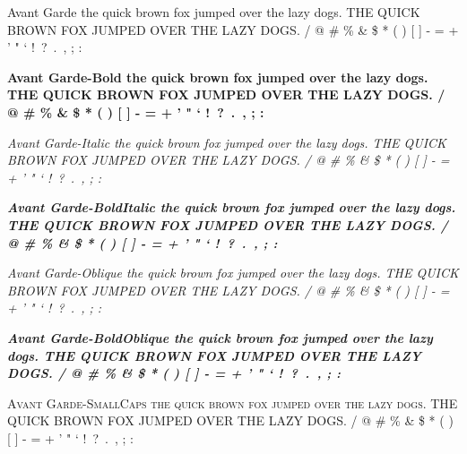 \documentclass{article}
\begin{document}
\newpage
{\selectfont
Avant Garde \newline
the quick brown fox jumped over the lazy dogs. \newline
THE QUICK BROWN FOX JUMPED OVER THE LAZY DOGS.  / @ \# \% \& \$ * ( ) [ ] - = + ' " ` !\ ?\ .\ , ; :  \par
{\bfseries
Avant Garde-Bold \newline
the quick brown fox jumped over the lazy dogs. \newline
THE QUICK BROWN FOX JUMPED OVER THE LAZY DOGS.  / @ \# \% \& \$ * ( ) [ ] - = + ' " ` !\ ?\ .\ , ; : } \par
{\itshape
Avant Garde-Italic \newline
the quick brown fox jumped over the lazy dogs. \newline
THE QUICK BROWN FOX JUMPED OVER THE LAZY DOGS.  / @ \# \% \& \$ * ( ) [ ] - = + ' " ` !\ ?\ .\ , ; : } \par
{\bfseries \itshape
Avant Garde-BoldItalic \newline
the quick brown fox jumped over the lazy dogs. \newline
THE QUICK BROWN FOX JUMPED OVER THE LAZY DOGS.  / @ \# \% \& \$ * ( ) [ ] - = + ' " ` !\ ?\ .\ , ; : } \par
{\slshape
Avant Garde-Oblique \newline
the quick brown fox jumped over the lazy dogs. \newline
THE QUICK BROWN FOX JUMPED OVER THE LAZY DOGS.  / @ \# \% \& \$ * ( ) [ ] - = + ' " ` !\ ?\ .\ , ; : } \par
{\bfseries \slshape
Avant Garde-BoldOblique \newline
the quick brown fox jumped over the lazy dogs. \newline
THE QUICK BROWN FOX JUMPED OVER THE LAZY DOGS.  / @ \# \% \& \$ * ( ) [ ] - = + ' " ` !\ ?\ .\ , ; : } \par
{\scshape
Avant Garde-SmallCaps \newline
the quick brown fox jumped over the lazy dogs. \newline
THE QUICK BROWN FOX JUMPED OVER THE LAZY DOGS.  / @ \# \% \& \$ * ( ) [ ] - = + ' " ` !\ ?\ .\ , ; : }} \par
\end{document}
